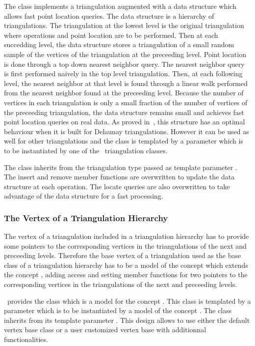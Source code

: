 The class 
implements a triangulation augmented with
a data structure which allows fast point location queries.
The data structure is a hierarchy 
of triangulations. The triangulation at the lowest level is
the original triangulation where operations and point location are to 
be performed.
Then at each succedding level, the data structure
stores a triangulation of a small random sample of the vertices
of the triangulation at the preceeding level. Point location
is done through a top down nearest neighbor query.
The nearest neighbor query is first
performed naively in the top level triangulation.
Then, at each following level, the nearest neighbor at that level
is found through a linear walk performed from
the nearest neighbor found at the preceeding level.
Because the number of vertices in each triangulation is only a small
fraction of the number of vertices of the preceeding triangulation,
the data structure remains small and achieves fast point location 
queries  on real
data. As proved in~\cite{d-iirdt-98}, this structure has an optimal behaviour
when it is built for Delaunay triangulations.
However it can be used as well for other triangulations
and the class  is templated by a parameter
which is to be instantiated by one of the \cgal\ triangulation
classes.


The class  inherits from the
triangulation type passed as template parameter . 
The insert and remove member functions
are  overwritten to update the data structure at each operation.
The locate queries are also overwritten to take advantage of the data
structure for a fast processing.

\subsubsection{The Vertex of a Triangulation Hierarchy}
The vertex of a triangulation  
included in a  triangulation hierarchy has to provide
some pointers to the corresponding vertices in the
triangulations of the next and preceeding levels.
Therefore the base vertex of a triangulation used as
the base class of a triangulation hierarchy has to be a model of the
concept
 which extends
the concept , adding
access and setting member functions 
for two pointers  to the corresponding vertices in the 
triangulations of the next and preceeding levels.

\cgal\ provides the class 
which is a model for the concept 
.
This class is templated by a parameter 
which is to be instantiated by a model of  the concept
.
The class  inherits
from its template parameter .
This design allows to use either the default
vertex base class or a user customized
vertex base with additionnal functionalities.












